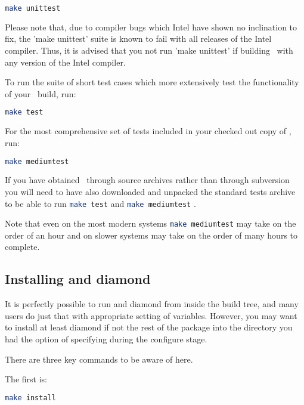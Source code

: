 \begin{lstlisting}[language=Bash]
make unittest
\end{lstlisting}

Please note that, due to compiler bugs which Intel have shown no inclination to
fix, the 'make unittest' suite is known to fail with all releases of the Intel
compiler. Thus, it is advised that you not run 'make unittest' if building
\fluidity\ with any version of the Intel compiler.

To run the suite of short test cases which more extensively test the
functionality of your \fluidity\ build, run:

\begin{lstlisting}[language=Bash]
make test
\end{lstlisting}

For the most comprehensive set of tests included in your checked out copy of
\fluidity, run:

\begin{lstlisting}[language=Bash]
make mediumtest
\end{lstlisting}

If you have obtained \fluidity\ through source archives rather than through
subversion you will need to have also downloaded and unpacked the standard
tests archive to be able to run \lstinline[language=Bash]+make test+ and
\lstinline[language=Bash]+make mediumtest+ .

Note that even on the most modern systems
\lstinline[language=Bash]+make mediumtest+ may take on the order of an hour and
on slower systems may take on the order of many hours to complete.

\subsection{Installing \fluidity and diamond}
\label{sec:installing_fluidity}

It is perfectly possible to run \fluidity and diamond from inside the build
tree, and many users do just that with appropriate setting of variables.
However, you may want to install at least diamond if not the rest of the
\fluidity package into the directory you had the option of specifying during
the configure stage.

There are three key commands to be aware of here.

The first is:

\begin{lstlisting}[language=Bash]
make install
\end{lstlisting}

